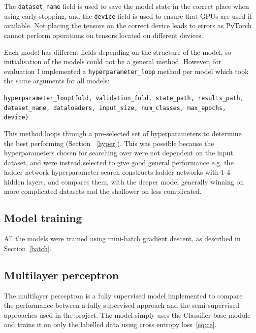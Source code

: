 The \texttt{dataset\_name} field is used to save the model state in the correct place when using early stopping, and the \texttt{device} field is 
used to ensure that GPUs are used if available. Not placing the tensors on the correct device 
leads to errors as PyTorch cannot perform operations on tensors located on different devices.

Each model has different fields depending on the structure of the model, so initialisation of the models could not be a general method. 
However, for evaluation I implemented a \texttt{hyperparameter\_loop} method per model 
which took the same arguments for all models:
\begin{center}
  \texttt{hyperparameter\_loop(fold, validation\_fold, state\_path, results\_path, dataset\_name, dataloaders, input\_size, num\_classes, max\_epochs, device)}
\end{center}

This method loops through a pre-selected set of hyperparameters to determine the best performing (Section ~\ref{hyper}).
This was possible because the hyperparameters chosen for searching over were not dependent on the input dataset, and were instead selected 
to give good general performance e.g. the ladder network hyperparameter search constructs ladder networks with 1-4 hidden layers, and
compares them, with the deeper model generally winning on more complicated datasets and the shallower on less complicated.

\subsection{Model training}

All the models were trained using mini-batch gradient descent, as described in Section~\ref{batch}.

\subsection{Multilayer perceptron}
The multilayer perceptron is a fully supervised model implemented to compare the performance between a fully supervised approach and the 
semi-supervised approaches used in the project. The model simply uses the Classifier base module and trains it on only the labelled data
using cross entropy loss~\eqref{eq:ce}.

